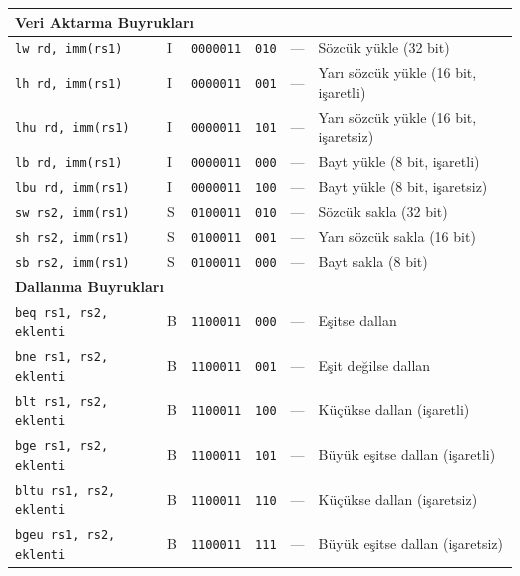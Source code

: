 {\begin{longtable}{@{}l@{\;}l@{\;}c@{\;}c@{\;}c@{\;}l@{}}
\multicolumn{6}{l}{\textbf{Veri Aktarma Buyrukları}}\index{veri aktarma buyrukları}\index{yükleme buyrukları}\index{saklama buyrukları} \\
\midrule
\texttt{lw rd, imm(rs1)}    & I & \texttt{0000011} & \texttt{010} & ---          & Sözcük yükle (32 bit) \\
\texttt{lh rd, imm(rs1)}    & I & \texttt{0000011} & \texttt{001} & ---          & Yarı sözcük yükle (16 bit, işaretli) \\
\texttt{lhu rd, imm(rs1)}   & I & \texttt{0000011} & \texttt{101} & ---          & Yarı sözcük yükle (16 bit, işaretsiz) \\
\texttt{lb rd, imm(rs1)}    & I & \texttt{0000011} & \texttt{000} & ---          & Bayt yükle (8 bit, işaretli) \\
\texttt{lbu rd, imm(rs1)}   & I & \texttt{0000011} & \texttt{100} & ---          & Bayt yükle (8 bit, işaretsiz) \\
\texttt{sw rs2, imm(rs1)}   & S & \texttt{0100011} & \texttt{010} & ---          & Sözcük sakla (32 bit) \\
\texttt{sh rs2, imm(rs1)}   & S & \texttt{0100011} & \texttt{001} & ---          & Yarı sözcük sakla (16 bit) \\
\texttt{sb rs2, imm(rs1)}   & S & \texttt{0100011} & \texttt{000} & ---          & Bayt sakla (8 bit) \\
\midrule

\multicolumn{6}{l}{\textbf{Dallanma Buyrukları}}\index{dallanma buyrukları} \\
\midrule
\texttt{beq rs1, rs2, eklenti}  & B & \texttt{1100011} & \texttt{000} & ---        & Eşitse dallan \\
\texttt{bne rs1, rs2, eklenti}  & B & \texttt{1100011} & \texttt{001} & ---        & Eşit değilse dallan \\
\texttt{blt rs1, rs2, eklenti}  & B & \texttt{1100011} & \texttt{100} & ---        & Küçükse dallan (işaretli) \\
\texttt{bge rs1, rs2, eklenti}  & B & \texttt{1100011} & \texttt{101} & ---        & Büyük eşitse dallan (işaretli) \\
\texttt{bltu rs1, rs2, eklenti} & B & \texttt{1100011} & \texttt{110} & ---        & Küçükse dallan (işaretsiz) \\
\texttt{bgeu rs1, rs2, eklenti} & B & \texttt{1100011} & \texttt{111} & ---        & Büyük eşitse dallan (işaretsiz) \\
\midrule


\end{longtable}}
